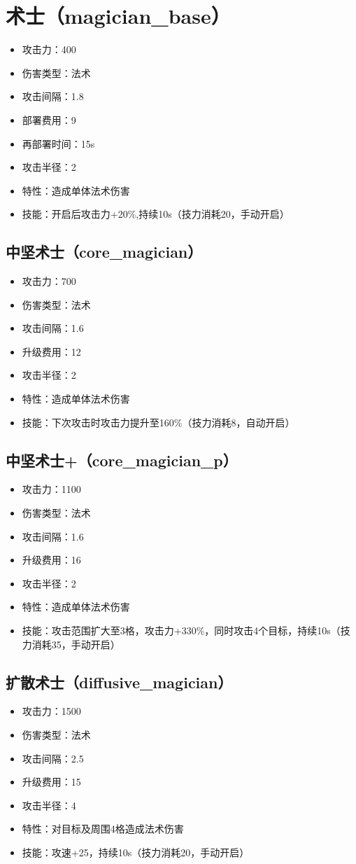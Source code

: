 	\section{术士（magician\_base）}
		\begin{itemize}
			\item 攻击力：400
			\item 伤害类型：法术
			\item 攻击间隔：1.8
			\item 部署费用：9
			\item 再部署时间：15s
			\item 攻击半径：2
			\item 特性：造成单体法术伤害
			\item 技能：开启后攻击力+20\%,持续10s（技力消耗20，手动开启）
		\end{itemize}
		\subsection{中坚术士（core\_magician）}
			\begin{itemize}
				\item 攻击力：700
				\item 伤害类型：法术
				\item 攻击间隔：1.6
				\item 升级费用：12
				\item 攻击半径：2
				\item 特性：造成单体法术伤害
				\item 技能：下次攻击时攻击力提升至160\%（技力消耗8，自动开启）
			\end{itemize}
		\subsection{中坚术士+（core\_magician\_p）}
			\begin{itemize}
				\item 攻击力：1100
				\item 伤害类型：法术
				\item 攻击间隔：1.6
				\item 升级费用：16
				\item 攻击半径：2
				\item 特性：造成单体法术伤害
				\item 技能：攻击范围扩大至3格，攻击力+330\%，同时攻击4个目标，持续10s（技力消耗35，手动开启）
			\end{itemize}
		\subsection{扩散术士（diffusive\_magician）}
			\begin{itemize}
				\item 攻击力：1500
				\item 伤害类型：法术
				\item 攻击间隔：2.5
				\item 升级费用：15
				\item 攻击半径：4
				\item 特性：对目标及周围4格造成法术伤害
				\item 技能：攻速+25，持续10s（技力消耗20，手动开启）
			\end{itemize}
